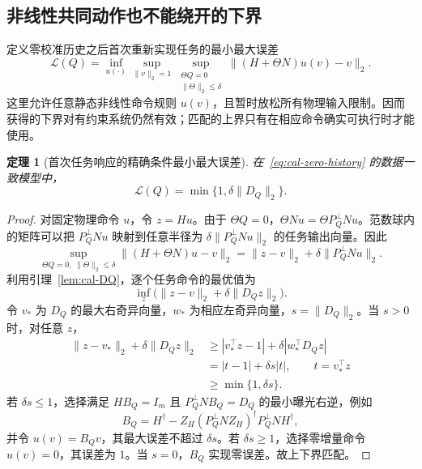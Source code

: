 \documentclass[11pt,a4paper]{article}
\numberwithin{equation}{section}
\newtheorem{theorem}{定理}[section]
\theoremstyle{definition}
\begin{document}
\subsection{非线性共同动作也不能绕开的下界}

定义零校准历史之后首次重新实现任务的最小最大误差
\begin{equation}
  \mathcal L(Q)=
  \inf_{u(\cdot)}
  \sup_{\|v\|_2=1}
  \sup_{\substack{\Theta Q=0\\\|\Theta\|_2\le\delta}}
  \|(H+\Theta N)u(v)-v\|_2 .
  \label{eq:cal-first-loss}
\end{equation}
这里允许任意静态非线性命令规则 $u(v)$，且暂时放松所有物理输入限制。因而获得的下界对有约束系统仍然有效；匹配的上界只有在相应命令确实可执行时才能使用。

\begin{theorem}[首次任务响应的精确条件最小最大误差]
\label{thm:cal-first-loss}
在~\eqref{eq:cal-zero-history} 的数据一致模型中，
\begin{equation}
  \boxed{\mathcal L(Q)=
  \min\{1,\delta\|D_Q\|_2\}.}
  \label{eq:cal-first-exact}
\end{equation}
\end{theorem}

\begin{proof}
对固定物理命令 $u$，令 $z=Hu$。由于 $\Theta Q=0$，$\Theta Nu=\Theta P_Q^\perp Nu$。范数球内的矩阵可以把 $P_Q^\perp Nu$ 映射到任意半径为 $\delta\|P_Q^\perp Nu\|_2$ 的任务输出向量。因此
\begin{equation}
  \sup_{\Theta Q=0,\;\|\Theta\|_2\le\delta}
  \|(H+\Theta N)u-v\|_2
  =
  \|z-v\|_2+\delta\|P_Q^\perp Nu\|_2 .
  \label{eq:cal-task-ball}
\end{equation}
利用引理~\ref{lem:cal-DQ}，逐个任务命令的最优值为
\begin{equation}
  \inf_z\big(\|z-v\|_2+\delta\|D_Qz\|_2\big).
  \label{eq:cal-task-prox}
\end{equation}
令 $v_*$ 为 $D_Q$ 的最大右奇异向量，$w_*$ 为相应左奇异向量，$s=\|D_Q\|_2$。当 $s>0$ 时，对任意 $z$，
\begin{align}
  \|z-v_*\|_2+\delta\|D_Qz\|_2
  &\ge
  |v_*^\top z-1|
  +\delta|w_*^\top D_Qz|\\
  &=
  |t-1|+\delta s|t|,
  \qquad t=v_*^\top z\\
  &\ge\min\{1,\delta s\}.
\end{align}
若 $\delta s\le1$，选择满足 $HB_Q=I_m$ 且 $P_Q^\perp NB_Q=D_Q$ 的最小曝光右逆，例如
\begin{equation}
  B_Q=
  H^\dagger-
  Z_H(P_Q^\perp NZ_H)^\dagger
  P_Q^\perp NH^\dagger ,
  \label{eq:cal-BQ}
\end{equation}
并令 $u(v)=B_Qv$，其最大误差不超过 $\delta s$。若 $\delta s\ge1$，选择零增量命令 $u(v)=0$，其误差为 $1$。当 $s=0$，$B_Q$ 实现零误差。故上下界匹配。
\end{proof}
\end{document}
